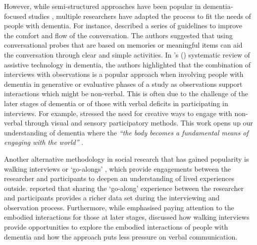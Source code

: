 However, while semi-structured approaches have been popular in dementia-focused studies \citep{samsi_everyday_2013,mazaheri2013experiences,cheston2000involving,lejman2013ethics}, multiple researchers have adapted the process to fit the needs of people with dementia. For instance, \cite{mayer2013lessons} described a series of guidelines to improve the comfort and flow of the conversation. The authors suggested that using conversational probes that are based on memories or meaningful items can aid the conversation through clear and simple activities. In \citeauthor{suijkerbuijk_active_2019}'s (\citeyear{suijkerbuijk_active_2019}) systematic review of assistive technology in dementia, the authors highlighted that the combination of interviews with observations is a popular approach when involving people with dementia in generative or evaluative phases of a study as observations support interactions which might be non-verbal. This is often due to the challenge of the later stages of dementia or of those with verbal deficits in participating in interviews. For example, \cite{kontos_embodiment_2013} stressed the need for creative ways to engage with non-verbal through visual and sensory participatory methods. This work opens up our understanding of dementia where the \textit{``the body becomes a fundamental means of engaging with the world''} \citep[p.296]{kontos_embodiment_2013}.

Another alternative methodology in social research that has gained popularity is walking interviews or `go-alongs' \citep{kullberg2017walking}, which provide engagements between the researcher and participants to deepen an understanding of lived experiences outside. \cite{hein2008mobile} reported that sharing the `go-along' experience between the researcher and participants provides a richer data set during the interviewing and observation process. Furthermore, while \cite{foley_struggle_2019} emphasised paying attention to the embodied interactions for those at later stages, \cite{kullberg2017walking}  discussed how walking interviews provide opportunities to explore the embodied interactions of people with dementia and how the approach puts less pressure on verbal communication. 

